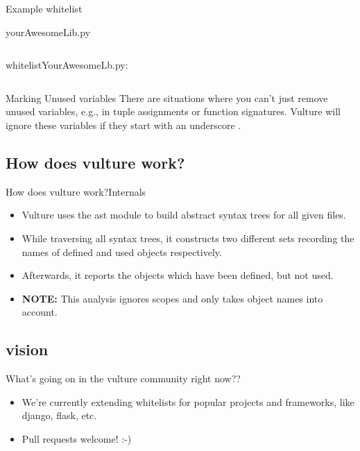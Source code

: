 \documentclass{beamer}
\begin{document}
\begin{frame}{Example whitelist}
    \begin{block}{yourAwesomeLib.py}
        \inputminted{python}{content/yourAwesomeLib.py}
    \end{block}
    \begin{block}{whitelistYourAwesomeLb.py:}
        \inputminted{python}{content/whitelistYourAwesomeLib.py}
    \end{block}
\end{frame}

\begin{frame}{Marking Unused variables}
    There are situations where you can't just remove unused variables, e.g., in tuple assignments or function signatures. Vulture will ignore these variables if they start with an underscore .   
\end{frame}

\subsection{How does vulture work?}

\begin{frame}{How does vulture work?}{Internals}
\begin{itemize}
    \item
        Vulture uses the ast module to build abstract syntax trees for all given files.
    \pause
    \item
        While traversing all syntax trees, it constructs two different sets recording the names of defined and used objects respectively.
    \pause
    \item
        Afterwards, it reports the objects which have been defined, but not used.
    \pause
    \item
        \textbf{NOTE:} This analysis ignores scopes and only takes object names into account.
\end{itemize}
\end{frame}

\subsection*{vision}
\begin{frame}{What's going on in the vulture community right now??}
    \begin{itemize}
        \item
            We're currently extending whitelists for popular projects and frameworks, like django, flask, etc.
        \item
            Pull requests welcome! :-)
    \end{itemize}
\end{frame}
\end{document}
